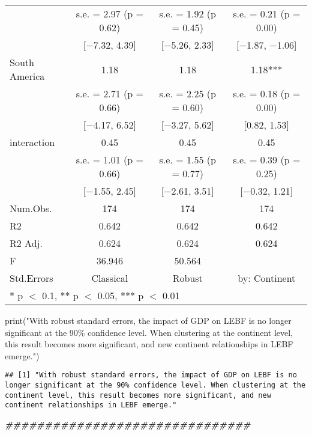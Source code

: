 \documentclass[
]{article}
\newenvironment{Shaded}{\begin{snugshade}}{\end{snugshade}}
\newcommand{\DocumentationTok}[1]{\textcolor[rgb]{0.56,0.35,0.01}{\textbf{\textit{#1}}}}
\newcommand{\FunctionTok}[1]{\textcolor[rgb]{0.00,0.00,0.00}{#1}}
\newcommand{\NormalTok}[1]{#1}
\newcommand{\StringTok}[1]{\textcolor[rgb]{0.31,0.60,0.02}{#1}}
\begin{document}
\begin{table}
\begin{tabular}[t]{lccc}
 & s.e. = \num{2.97} (p = \num{0.62}) & s.e. = \num{1.92} (p = \num{0.45}) & s.e. = \num{0.21} (p = \num{0.00})\\
 & {}[\num{-7.32}, \num{4.39}] & {}[\num{-5.26}, \num{2.33}] & {}[\num{-1.87}, \num{-1.06}]\\
South America & \num{1.18} & \num{1.18} & \num{1.18}***\\
 & s.e. = \num{2.71} (p = \num{0.66}) & s.e. = \num{2.25} (p = \num{0.60}) & s.e. = \num{0.18} (p = \num{0.00})\\
 & {}[\num{-4.17}, \num{6.52}] & {}[\num{-3.27}, \num{5.62}] & {}[\num{0.82}, \num{1.53}]\\
interaction & \num{0.45} & \num{0.45} & \num{0.45}\\
 & s.e. = \num{1.01} (p = \num{0.66}) & s.e. = \num{1.55} (p = \num{0.77}) & s.e. = \num{0.39} (p = \num{0.25})\\
 & {}[\num{-1.55}, \num{2.45}] & {}[\num{-2.61}, \num{3.51}] & {}[\num{-0.32}, \num{1.21}]\\
\midrule
Num.Obs. & \num{174} & \num{174} & \num{174}\\
R2 & \num{0.642} & \num{0.642} & \num{0.642}\\
R2 Adj. & \num{0.624} & \num{0.624} & \num{0.624}\\
F & \num{36.946} & \num{50.564} & \\
Std.Errors & Classical & Robust & by: Continent\\
\bottomrule
\multicolumn{4}{l}{\rule{0pt}{1em}* p $<$ 0.1, ** p $<$ 0.05, *** p $<$ 0.01}\\
\end{tabular}
\end{table}

\begin{Shaded}
\begin{Highlighting}[]
\FunctionTok{print}\NormalTok{(}\StringTok{"With robust standard errors, the impact of GDP on LEBF is no longer significant at the 90\% confidence level. When clustering at the continent level, this result becomes more significant, and new continent relationships in LEBF emerge."}\NormalTok{) }
\end{Highlighting}
\end{Shaded}

\begin{verbatim}
## [1] "With robust standard errors, the impact of GDP on LEBF is no longer significant at the 90% confidence level. When clustering at the continent level, this result becomes more significant, and new continent relationships in LEBF emerge."
\end{verbatim}

\begin{Shaded}
\begin{Highlighting}[]
\DocumentationTok{\#\#\#\#\#\#\#\#\#\#\#\#\#\#\#\#\#\#\#\#\#\#\#\#\#\#\#\#\#\#\#}
\end{Highlighting}
\end{Shaded}
\end{document}
